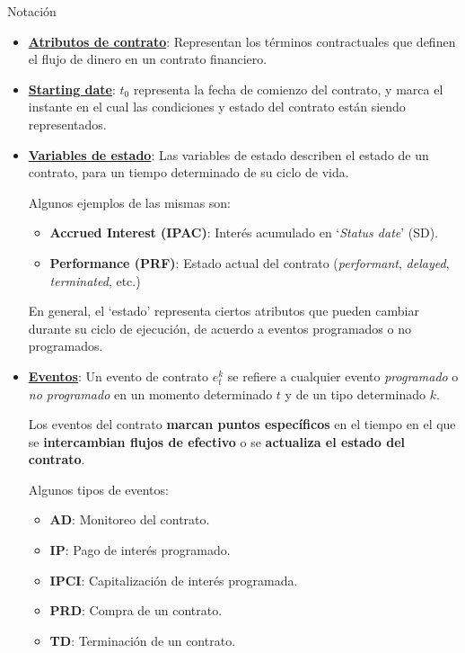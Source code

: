 \documentclass{beamer}
\newcommand{\nologo}{\setbeamertemplate{logo}{}} %
\begin{document}
{\nologo
\begin{frame}{Notación}
\begin{itemize}
    \item \textbf{\underline{Atributos de contrato}}: Representan los términos contractuales que definen el flujo de dinero en un contrato financiero.
    \pause
\item \textbf{\underline{Starting date}}: $t_0$ representa la fecha de comienzo del contrato, y marca el instante en el cual las condiciones y estado del contrato están siendo representados. 
    \pause
    \item \textbf{\underline{Variables de estado}}: Las variables de estado describen el estado de un contrato, para un tiempo determinado de su ciclo de vida. 

        Algunos ejemplos de las mismas son: 
        \pause
            \begin{itemize}
                \item \textbf{Accrued Interest (IPAC)}: Interés acumulado en `\textit{Status date}' (SD).
                \item \textbf{Performance (PRF)}: Estado actual del contrato (\textit{performant}, \textit{delayed}, \textit{terminated}, etc.)
            \end{itemize}
        \pause
        En general, el ‘estado’ representa ciertos atributos que pueden cambiar durante su ciclo de ejecución, de acuerdo a eventos programados o no programados. 
\end{itemize}
\end{frame}
}

\begin{frame}
    \begin{itemize}
        \item \textbf{\underline{Eventos}}: Un evento de contrato $e_t^k$ se refiere a cualquier evento \textit{programado} o \textit{no programado} en un momento determinado $t$ y de un tipo determinado $k$. 
        \vfill

        Los eventos del contrato \textbf{marcan puntos específicos} en el tiempo en el que se \textbf{intercambian flujos de efectivo} o se \textbf{actualiza el estado del contrato}. 

        \vfill
        \pause

        Algunos tipos de eventos:

        \begin{itemize}
            \item \textbf{AD}: Monitoreo del contrato.
            \item \textbf{IP}: Pago de interés programado.
            \item \textbf{IPCI}: Capitalización de interés programada.
            \item \textbf{PRD}: Compra de un contrato.
            \item \textbf{TD}: Terminación de un contrato.

        \end{itemize}
    \end{itemize}
\end{frame}
\end{document}

